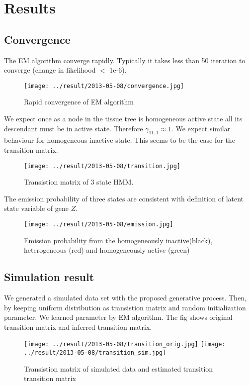 \documentclass{article}
\begin{document}
\section{Results}
\subsection{Convergence}
The EM algorithm converge rapidly. Typically it takes less than 50 iteration to converge (change in likelihood $<$ 1e-6). 
\begin{figure}[htbp]
	\begin{center}
		\texttt{[image: ../result/2013-05-08/convergence.jpg]}
	\end{center}
	\caption{Rapid convergence of EM algorithm}
	\label{fig:convergence}
\end{figure}

We expect once as a node in the tissue tree is homogeneous active state all its descendant must be in active state. 
Therefore $\gamma_{11;1} \approx 1$. We expect similar behaviour for homogeneous inactive state. This seems to be the 
case for the transition matrix.
\begin{figure}[h]
	\begin{center}
		\texttt{[image: ../result/2013-05-08/transition.jpg]}
	\end{center}
	\caption{Transistion matrix of 3 state HMM.}
	\label{fig:transistion}
\end{figure}


The emission probability of three states are consistent with definition of latent state variable
of gene $Z$.
\begin{figure}[h]
	\begin{center}
		\texttt{[image: ../result/2013-05-08/emission.jpg]}
	\end{center}
	\caption{Emission probability from the homogeneously inactive(black), heterogeneous (red) and homogeneously active (green)}
	\label{fig:emission}
\end{figure}


\subsection{Simulation result}
We generated a simulated data set with the proposed generative process. Then, by keeping uniform
distribution as transistion matrix and random initialization parameter. We learned parameter 
by EM algorithm. The fig shows original transition matrix and inferred transition matrix.
\begin{figure}[h]
	\begin{center}
		\texttt{[image: ../result/2013-05-08/transition\_orig.jpg]}
		\texttt{[image: ../result/2013-05-08/transition\_sim.jpg]}
	\end{center}
	\caption{Transistion matrix of simulated data and estimated transition transition matrix}
	\label{fig:transistion2}
\end{figure}
\end{document}

